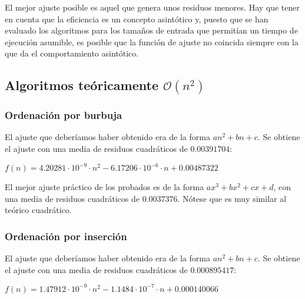 \documentclass[a4paper, 11pt]{article} %
\begin{document}
El mejor ajuste posible es aquel que genera unos residuos menores. Hay que tener en cuenta que la 
eficiencia es un concepto asintótico y, puesto que se han evaluado los algoritmos
para los tamaños de entrada que permitían un tiempo de ejecución asumible, 
es posible que la función de ajuste no coincida siempre con la que da el comportamiento asintótico.

\subsection{Algoritmos teóricamente $\mathcal{O}(n^2)$}

  \subsubsection{Ordenación por burbuja}
  El ajuste que deberíamos haber obtenido era de la forma $a n^2+bn+c$.
  Se obtiene el ajuste con una media de residuos cuadráticos de $0.00391704$:
  \begin{center}
   $f(n)=4.20281\cdot 10^{-9}\cdot n^2-6.17206\cdot 10^{-6}\cdot n +0.00487322$
  \end{center}

  El mejor ajuste práctico de los probados es de la forma $ax^3+bx^2+cx+d$,
  con una media de residuos cuadráticos de $0.0037376$. Nótese que es muy similar
  al teórico cuadrático.

    \noindent{}

  \subsubsection{Ordenación por inserción}
  El ajuste que deberíamos haber obtenido era de la forma $a n^2+bn+c$.
  Se obtiene el ajuste con una media de residuos cuadráticos de $0.000895417$:
  \begin{center}
   $f(n)=1.47912\cdot 10^{-9}\cdot n^2-1.1484\cdot 10^{-7}\cdot n+0.000140066$
  \end{center}
  
\end{document}
